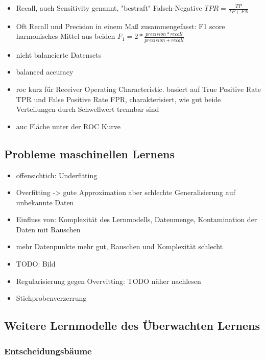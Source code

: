 \begin{itemize}
		\item Recall, auch Sensitivity genannt, "bestraft" Falsch-Negative $TPR = \frac{TP}{TP + FN}$
		\item Oft Recall und Precision in einem Maß zusammengefasst: F1 score harmonisches Mittel aus beiden $F_1 = 2 * \frac{precision * recall}{precision + recall}$
		\item nicht balancierte Datensets
		\item balanced accuracy
		\item roc kurz für Receiver Operating Characteristic. basiert auf True Positive Rate TPR und False Positive Rate FPR, charakterisiert, wie gut beide Verteilungen durch Schwellwert trennbar sind
		\item auc Fläche unter der ROC Kurve
	\end{itemize}
	
	\subsection{Probleme maschinellen Lernens}
				
		\begin{itemize}
			\item offensichtich: Underfitting
			\item Overfitting -> gute Approximation aber schlechte Generalisierung auf unbekannte Daten
			\item Einfluss von: Komplexität des Lernmodells, Datenmenge, Kontamination der Daten mit Rauschen
			\item mehr Datenpunkte mehr gut, Rauschen und Komplexität schlecht
			\item TODO: Bild
			\item Regularisierung gegen Overvitting: TODO näher nachlesen
			\item Stichprobenverzerrung
		\end{itemize}

	\subsection{Weitere Lernmodelle des Überwachten Lernens}
	
		\subsubsection{Entscheidungsbäume}
		
